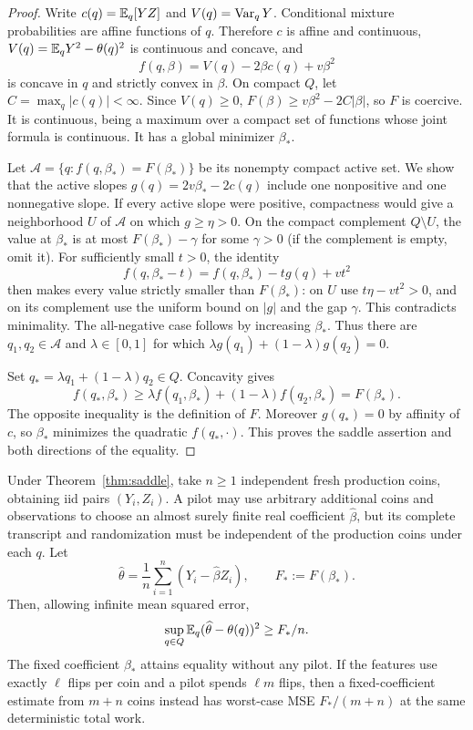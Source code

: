 \begin{proof}
Write $c(q)=\mathbb E_q[YZ]$ and $V(q)=\operatorname{Var}_qY$. Conditional mixture probabilities
are affine functions of $q$. Therefore $c$ is affine and continuous,
$V(q)=\mathbb E_qY^2-\theta(q)^2$ is continuous and concave, and
\[
 f(q,\beta)=V(q)-2\beta c(q)+v\beta^2
\]
is concave in $q$ and strictly convex in $\beta$.
On compact $Q$, let $C=\max_q|c(q)|<\infty$. Since $V(q)\ge0$,
$F(\beta)\ge v\beta^2-2C|\beta|$, so $F$ is coercive. It is continuous,
being a maximum over a compact set of functions whose joint formula is
continuous. It has a global minimizer $\beta_*$.

Let $\mathcal A=\{q:f(q,\beta_*)=F(\beta_*)\}$ be its nonempty compact active
set. We show that the active slopes
$g(q)=2v\beta_*-2c(q)$ include one nonpositive and one nonnegative slope.
If every active slope were positive, compactness would give a neighborhood
$U$ of $\mathcal A$ on which $g\ge\eta>0$. On the compact complement
$Q\setminus U$, the value at $\beta_*$ is at most $F(\beta_*)-\gamma$ for
some $\gamma>0$ (if the complement is empty, omit it). For sufficiently small
$t>0$, the identity
\[
 f(q,\beta_*-t)=f(q,\beta_*)-t g(q)+vt^2
\]
then makes every value strictly smaller than $F(\beta_*)$: on $U$ use
$t\eta-vt^2>0$, and on its complement use the uniform bound on $|g|$ and
the gap $\gamma$. This contradicts minimality. The all-negative case follows
by increasing $\beta_*$. Thus there are $q_1,q_2\in\mathcal A$ and
$\lambda\in[0,1]$ for which
$\lambda g(q_1)+(1-\lambda)g(q_2)=0$.

Set $q_*=\lambda q_1+(1-\lambda)q_2\in Q$. Concavity gives
\[
 f(q_*,\beta_*)\ge\lambda f(q_1,\beta_*)+(1-\lambda)f(q_2,\beta_*)
 =F(\beta_*).
\]
The opposite inequality is the definition of $F$. Moreover $g(q_*)=0$
by affinity of $c$, so $\beta_*$ minimizes the quadratic $f(q_*,\cdot)$.
This proves the saddle assertion and both directions of the equality.
\end{proof}

\begin{theorem}
Under Theorem~\ref{thm:saddle}, take $n\ge1$ independent fresh production
coins, obtaining iid pairs $(Y_i,Z_i)$. A pilot may use arbitrary additional
coins and observations to choose an almost surely finite real coefficient
$\widehat\beta$, but its complete transcript and randomization must be
independent of the production coins under each $q$. Let
\[
 \widehat\theta=\frac1n\sum_{i=1}^n(Y_i-\widehat\beta Z_i),\qquad
 F_*:=F(\beta_*).
\]
Then, allowing infinite mean squared error,
\[
 \sup_{q\in Q}\mathbb E_q(\widehat\theta-\theta(q))^2\ge F_*/n.
\]
The fixed coefficient $\beta_*$ attains equality without any pilot. If the
features use exactly $\ell$ flips per coin and a pilot spends $\ell m$ flips,
then a fixed-coefficient estimate from $m+n$ coins instead has worst-case
MSE $F_*/(m+n)$ at the same deterministic total work.
\end{theorem}

